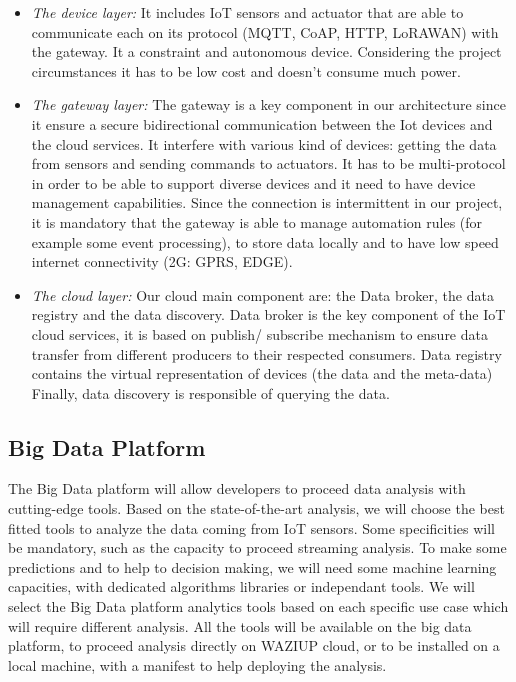 \begin{itemize}
  \item \emph{The device layer:}
    It includes IoT sensors and actuator that are able to communicate each on its protocol (MQTT, CoAP, HTTP, LoRAWAN) with the gateway. 
It a constraint and autonomous device. 
Considering the project circumstances it has to be low cost and doesn’t consume much power.
  \item \emph{The gateway layer:}
  The gateway is a key component in our architecture since it ensure a secure bidirectional communication between the Iot devices and the cloud services.
 It interfere with various kind of devices: getting the data from sensors and sending commands to actuators.
  It has to be multi-protocol in order to be able to support diverse devices and it need to have device management capabilities.
Since the connection is intermittent in our project, it is mandatory that the gateway is able to manage automation rules (for example some event processing), to store data locally and to have low speed internet connectivity (2G: GPRS, EDGE).
  \item \emph{The cloud layer:}
  Our cloud main component are: the Data broker, the data registry and the data discovery. 
Data broker is the key component of the IoT cloud services, it is based on publish/ subscribe mechanism to ensure data transfer from different producers to their respected consumers.
Data registry contains the virtual representation of devices (the data and the meta-data)
Finally, data discovery is responsible of querying the data.
\end{itemize}

\subsection{Big Data Platform}

The Big Data platform will allow developers to proceed data analysis with cutting-edge tools. 
Based on the state-of-the-art analysis, we will choose the best fitted tools to analyze the data coming from IoT sensors. 
Some specificities will be mandatory, such as the capacity to proceed streaming analysis. 
To make some predictions and to help to decision making, we will need some machine learning capacities, with dedicated algorithms libraries or independant tools.
We will select the Big Data platform analytics tools based on each specific use case which will require different analysis. 
All the tools will be available on the big data platform, to proceed analysis directly on WAZIUP cloud, or to be installed on a local machine, with a manifest to help deploying the analysis.


